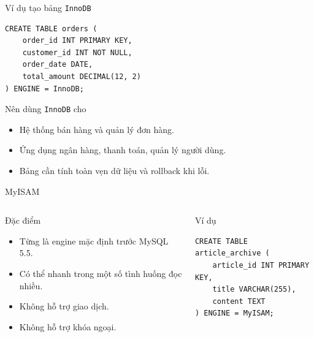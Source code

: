 \documentclass[aspectratio=169,11pt]{beamer}
\newcommand{\code}[1]{\texttt{#1}}
\newcommand{\smallitem}{\setlength{\itemsep}{2pt}}
\begin{document}
\begin{frame}[fragile]{Ví dụ tạo bảng \code{InnoDB}}
\begin{lstlisting}
CREATE TABLE orders (
    order_id INT PRIMARY KEY,
    customer_id INT NOT NULL,
    order_date DATE,
    total_amount DECIMAL(12, 2)
) ENGINE = InnoDB;
\end{lstlisting}
\begin{block}{Nên dùng \code{InnoDB} cho}
\begin{itemize}\smallitem
  \item Hệ thống bán hàng và quản lý đơn hàng.
  \item Ứng dụng ngân hàng, thanh toán, quản lý người dùng.
  \item Bảng cần tính toàn vẹn dữ liệu và rollback khi lỗi.
\end{itemize}
\end{block}
\end{frame}

\begin{frame}[fragile]{MyISAM}
\begin{columns}[T,onlytextwidth]
\begin{block}{Đặc điểm}
\begin{itemize}\smallitem
  \item Từng là engine mặc định trước MySQL 5.5.
  \item Có thể nhanh trong một số tình huống đọc nhiều.
  \item Không hỗ trợ giao dịch.
  \item Không hỗ trợ khóa ngoại.
\end{itemize}
\end{block}
\begin{block}{Ví dụ}
\begin{lstlisting}
CREATE TABLE article_archive (
    article_id INT PRIMARY KEY,
    title VARCHAR(255),
    content TEXT
) ENGINE = MyISAM;
\end{lstlisting}
\end{block}
\end{columns}
\end{frame}
\end{document}
